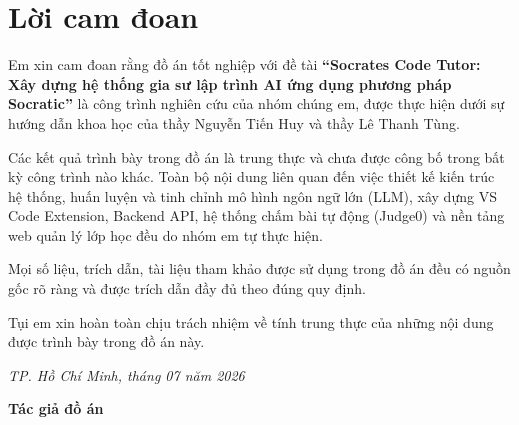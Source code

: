 \chapter*{Lời cam đoan}
\label{thanks}

Em xin cam đoan rằng đồ án tốt nghiệp với đề tài \textbf{``Socrates Code Tutor: Xây dựng hệ thống gia sư lập trình AI ứng dụng phương pháp Socratic''} là công trình nghiên cứu của nhóm chúng em, được thực hiện dưới sự hướng dẫn khoa học của thầy Nguyễn Tiến Huy và thầy Lê Thanh Tùng.

Các kết quả trình bày trong đồ án là trung thực và chưa được công bố trong bất kỳ công trình nào khác. Toàn bộ nội dung liên quan đến việc thiết kế kiến trúc hệ thống, huấn luyện và tinh chỉnh mô hình ngôn ngữ lớn (LLM), xây dựng VS Code Extension, Backend API, hệ thống chấm bài tự động (Judge0) và nền tảng web quản lý lớp học đều do nhóm em tự thực hiện.

Mọi số liệu, trích dẫn, tài liệu tham khảo được sử dụng trong đồ án đều có nguồn gốc rõ ràng và được trích dẫn đầy đủ theo đúng quy định.

Tụi em xin hoàn toàn chịu trách nhiệm về tính trung thực của những nội dung được trình bày trong đồ án này.

\begin{flushright}
\textit{TP. Hồ Chí Minh, tháng 07 năm 2026}

\vspace{1.5cm}

\textbf{Tác giả đồ án}

\vspace{2cm}


\end{flushright}
